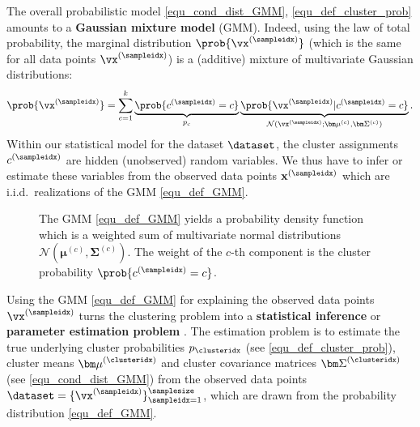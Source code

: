 \documentclass[12pt]{report}
\newcommand{\boundellipse}[3]%
{(#1) ellipse (#2 and #3)
}
\begin{document}
The overall probabilistic model \eqref{equ_cond_dist_GMM}, \eqref{equ_def_cluster_prob} 
amounts to a {\bf Gaussian mixture model} (GMM). Indeed, using the law of total probability, 
the marginal distribution $\prob{\vx^{(\sampleidx)}}$ (which is the same for all data points 
$\vx^{(\sampleidx)}$) is a (additive) mixture of multivariate Gaussian distributions: 
\begin{equation} 
\label{equ_def_GMM}
 \prob{\vx^{(\sampleidx)}} = \sum_{c=1}^{k} \underbrace{\prob{c^{(\sampleidx)}=c}}_{p_{c}}  \underbrace{\prob{\vx^{(\sampleidx)} | c^{(\sampleidx)}=c}}_{\mathcal{N}(\vx^{(\sampleidx)};{\bm \mu}^{(c)}, {\bm \Sigma}^{(c)})}. 
\end{equation} 
Within our statistical model for the dataset $\dataset$, the cluster assignments $c^{(\sampleidx)}$ are 
hidden (unobserved) random variables. We thus have to infer or estimate these variables from the 
observed data points $\mathbf{x}^{(\sampleidx)}$ which are i.i.d.\ realizations of the GMM \eqref{equ_def_GMM}. 

\begin{figure}
\begin{center}
\end{center}
\label{fig_GMM_elippses}
\caption{The GMM \eqref{equ_def_GMM} yields a probability density function which 
is a weighted sum of multivariate normal distributions $\mathcal{N}({\bm \mu}^{(c)}, {\bm \Sigma}^{(c)})$. 
The weight of the $c$-th component is the cluster probability $ \prob{c^{(\sampleidx)}=c}$.}
\end{figure}

Using the GMM \eqref{equ_def_GMM} for explaining the observed data points $\vx^{(\sampleidx)}$ 
turns the clustering problem into a {\bf statistical inference} or {\bf parameter estimation problem} \cite{kay,LC}. 
The estimation problem is to estimate the true underlying cluster probabilities $p_{\clusteridx}$ 
(see \eqref{equ_def_cluster_prob}), cluster means ${\bm \mu}^{(\clusteridx)}$ and cluster 
covariance matrices ${\bm \Sigma}^{(\clusteridx)}$ (see \eqref{equ_cond_dist_GMM}) from 
the observed data points $\dataset = \{ \vx^{(\sampleidx)} \}_{\sampleidx=1}^{\samplesize}$, 
which are drawn from the probability distribution \eqref{equ_def_GMM}. 
\end{document}
